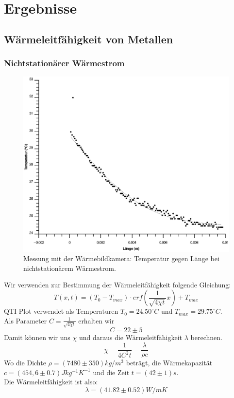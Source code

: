 \documentclass[12pt,a4paper,twopage]{article}
\begin{document}
\section{Ergebnisse}
\subsection{Wärmeleitfähigkeit von Metallen}
\subsubsection{Nichtstationärer Wärmestrom}

\begin{figure}[H]
\centering
\includegraphics[scale=0.8]{nichtstationaer.eps}
\caption{Messung mit der Wärmebildkamera: Temperatur gegen Länge bei nichtstationärem Wärmestrom.}
\end{figure}

Wir verwenden zur Bestimmung der Wärmeleitfähigkeit folgende Gleichung:
$$T(x,t)=(T_0 - T_{max}) \cdot erf\left(\frac{1}{\sqrt{4\chi t}}x\right) + T_{max}$$
QTI-Plot verwendet als Temperaturen $T_0=24.50^\circ C$ und $T_{max}=29.75^\circ C$.\\
Als Parameter $C=\frac{1}{\sqrt{4\chi t}}$ erhalten wir
$$C=22 \pm 5$$
Damit können wir uns $\chi$ und daraus die Wärmeleitfähigkeit $\lambda$ berechnen.
$$\chi = \frac{1}{4C^2 t}=\frac{\lambda}{\rho c}$$
Wo die Dichte $\rho = (7480 \pm 350)kg/m^3$ beträgt, die Wärmekapazität $c=(454,6 \pm 0.7)Jkg^{-1}K^{-1}$ und die Zeit $t=(42 \pm 1)s$.\\
Die Wärmeleitfähigkeit ist also:
$$\boxed{\lambda = (41.82 \pm 0.52)W/m K}$$
\end{document}
